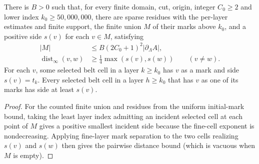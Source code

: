 \begin{lemma}
    \label{thm:area_law_uniform_separated_initial_marks}
    \leanok
    There is $B>0$ such that, for every finite domain, cut, origin,
    integer $C_0\ge2$ and lower index $k_0\ge50{,}000{,}000$, there are
    sparse residues with the per-layer estimates and finite support,
    the finite union $M$ of their marks above $k_0$, and a
    positive side $s(v)$ for each $v\in M$, satisfying
    \begin{align}
        |M| & \le B(2C_0+1)^2|\partial_\Lambda A|,     \\
        \operatorname{dist}_\infty(v,w)
            & \ge\frac14\max(s(v),s(w))\qquad(v\ne w).
    \end{align}
    For each $v$, some selected belt cell in a layer $k\ge k_0$ has $v$
    as a mark and side $s(v)=t_k$. Every selected belt cell in a layer $h\ge k_0$ that has $v$ as one
    of its marks has side at least $s(v)$.
\end{lemma}
\begin{proof}\leanok
    For the counted finite union and residues from the uniform initial-mark
    bound, taking the least
    layer index admitting an incident selected cell at each point of $M$
    gives a positive smallest incident side because the fine-cell exponent is
    nondecreasing.
    Applying fine-layer mark separation to the two cells realizing $s(v)$ and $s(w)$
    then gives the pairwise distance bound (which is vacuous when $M$ is empty).
\end{proof}
